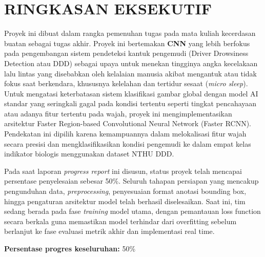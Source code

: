 \documentclass[11pt,a4paper,oneside]{report}
\begin{document}

\tableofcontents

\newpage


\chapter*{RINGKASAN EKSEKUTIF}


Proyek ini dibuat dalam rangka pemenuhan tugas pada mata kuliah kecerdasan buatan sebagai tugas akhir. Proyek ini bertemakan \textbf{CNN} yang lebih berfokus pada pengembangan sistem pendeteksi kantuk pengemudi (Driver Drowsiness Detection atau DDD) sebagai upaya untuk menekan tingginya angka kecelakaan lalu lintas yang disebabkan oleh kelalaian manusia akibat mengantuk atau tidak fokus saat berkendara, khususnya kelelahan dan tertidur sesaat (\textit{micro sleep}). Untuk mengatasi keterbatasan sistem klasifikasi gambar global dengan model AI standar yang seringkali gagal pada kondisi tertentu seperti tingkat pencahayaan atau adanya fitur tertentu pada wajah, proyek ini mengimplementasikan arsitektur Faster Region-based Convolutional Neural Network (Faster RCNN). Pendekatan ini dipilih karena kemampuannya dalam melokalisasi fitur wajah secara presisi dan mengklasifikasikan kondisi pengemudi ke dalam empat kelas indikator biologis menggunakan dataset NTHU DDD.

Pada saat laporan \textit{progress report} ini disusun, status proyek telah mencapai persentase penyelesaian sebesar 50\%. Seluruh tahapan persiapan yang mencakup pengunduhan data, \textit{preprocessing}, penyesuaian format anotasi bounding box, hingga pengaturan arsitektur model telah berhasil diselesaikan. Saat ini, tim sedang berada pada fase \textit{training} model utama, dengan pemantauan loss function secara berkala guna memastikan model terhindar dari overfitting sebelum berlanjut ke fase evaluasi metrik akhir dan implementasi real time.

\vspace{0.5cm}

\noindent
\textbf{Persentase progres keseluruhan:} 50\%
\end{document}
